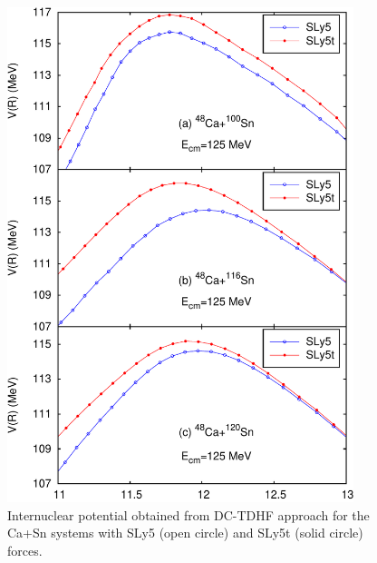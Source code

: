 \begin{figure}
	\includegraphics[width=0.9\textwidth]{../Figures/TensorPot/V4_ppt.pdf}
	\caption{Internuclear potential obtained from DC-TDHF approach for the Ca+Sn systems with SLy5 (open circle) and SLy5t (solid circle) forces.
		\label{Fig:heavy}}
\end{figure}

